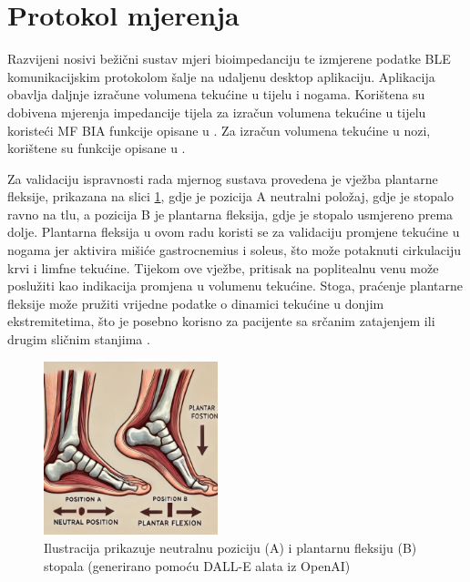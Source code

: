 \documentclass[../diplomski_rad.tex]{subfiles}
\begin{document}
\section{Protokol mjerenja}

Razvijeni nosivi bežični sustav mjeri bioimpedanciju te izmjerene podatke BLE komunikacijskim protokolom šalje na udaljenu desktop aplikaciju. 
Aplikacija obavlja daljnje izračune volumena tekućine u tijelu i nogama. 
Korištena su dobivena mjerenja impedancije tijela za izračun volumena tekućine u tijelu koristeći MF BIA funkcije opisane u \cite{Sanchez2013}. 
Za izračun volumena tekućine u nozi, korištene su funkcije opisane u \cite{Delano2022}.

Za validaciju ispravnosti rada mjernog sustava provedena je vježba plantarne fleksije, 
prikazana na slici \ref{slk:plantarna_fleksija}, gdje je pozicija A neutralni položaj, 
gdje je stopalo ravno na tlu, a pozicija B je plantarna fleksija, gdje je stopalo usmjereno prema dolje. 
Plantarna fleksija u ovom radu koristi se za validaciju promjene tekućine u nogama jer aktivira 
mišiće gastrocnemius i soleus, što može potaknuti cirkulaciju krvi i limfne tekućine. 
Tijekom ove vježbe, pritisak na poplitealnu venu može poslužiti kao indikacija promjena u volumenu tekućine. 
Stoga, praćenje plantarne fleksije može pružiti vrijedne podatke o dinamici tekućine u donjim ekstremitetima, 
što je posebno korisno za pacijente sa srčanim zatajenjem ili drugim sličnim stanjima \cite{AVILADEOLIVEIRA2022102625}. 

\begin{figure}[htb]
    \centering
    \includegraphics[width=0.45\textwidth]{Figures/plantarna_fleksija.jpg} 
    \caption{Ilustracija prikazuje neutralnu poziciju (A) i plantarnu fleksiju (B) stopala \newline (generirano pomoću DALL-E alata iz OpenAI)
    }
    \label{slk:plantarna_fleksija}
\end{figure}
\end{document}
